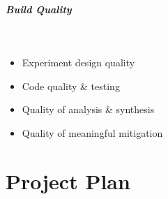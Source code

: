 \subparagraph{Build Quality}~
\begin{itemize}
	\item Experiment design quality
	\item Code quality \& testing
	\item Quality of analysis \& synthesis
	\item Quality of meaningful mitigation
\end{itemize}
\section{Project Plan}
\noindent
{}

